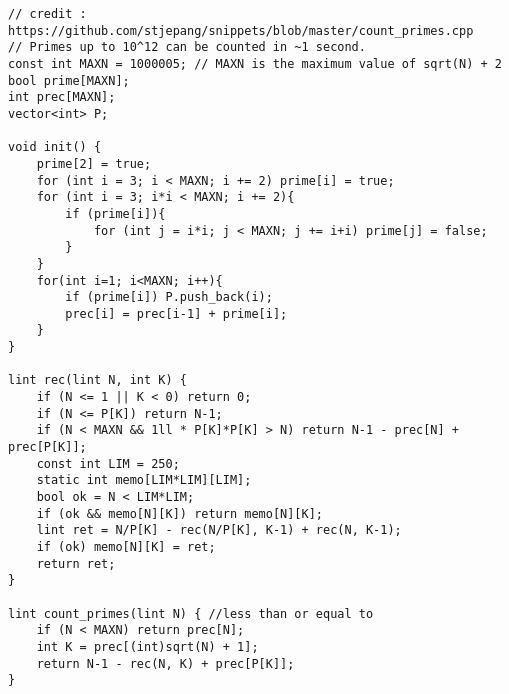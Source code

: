 \documentclass[landscape, 8pt, a4paper, oneside,  twocolumn]{extarticle}
\begin{document}
\begin{verbatim}
// credit : https://github.com/stjepang/snippets/blob/master/count_primes.cpp
// Primes up to 10^12 can be counted in ~1 second.
const int MAXN = 1000005; // MAXN is the maximum value of sqrt(N) + 2
bool prime[MAXN]; 
int prec[MAXN];
vector<int> P;

void init() {
	prime[2] = true;
	for (int i = 3; i < MAXN; i += 2) prime[i] = true;
	for (int i = 3; i*i < MAXN; i += 2){
		if (prime[i]){
			for (int j = i*i; j < MAXN; j += i+i) prime[j] = false;
		}
	}
	for(int i=1; i<MAXN; i++){
		if (prime[i]) P.push_back(i);
		prec[i] = prec[i-1] + prime[i];
	}
}

lint rec(lint N, int K) {
	if (N <= 1 || K < 0) return 0;
	if (N <= P[K]) return N-1;
	if (N < MAXN && 1ll * P[K]*P[K] > N) return N-1 - prec[N] + prec[P[K]];
	const int LIM = 250;
	static int memo[LIM*LIM][LIM];
	bool ok = N < LIM*LIM;
	if (ok && memo[N][K]) return memo[N][K];
	lint ret = N/P[K] - rec(N/P[K], K-1) + rec(N, K-1);
	if (ok) memo[N][K] = ret;
	return ret;
}

lint count_primes(lint N) { //less than or equal to
	if (N < MAXN) return prec[N];
	int K = prec[(int)sqrt(N) + 1];
	return N-1 - rec(N, K) + prec[P[K]];
}
\end{verbatim}
\end{document}
